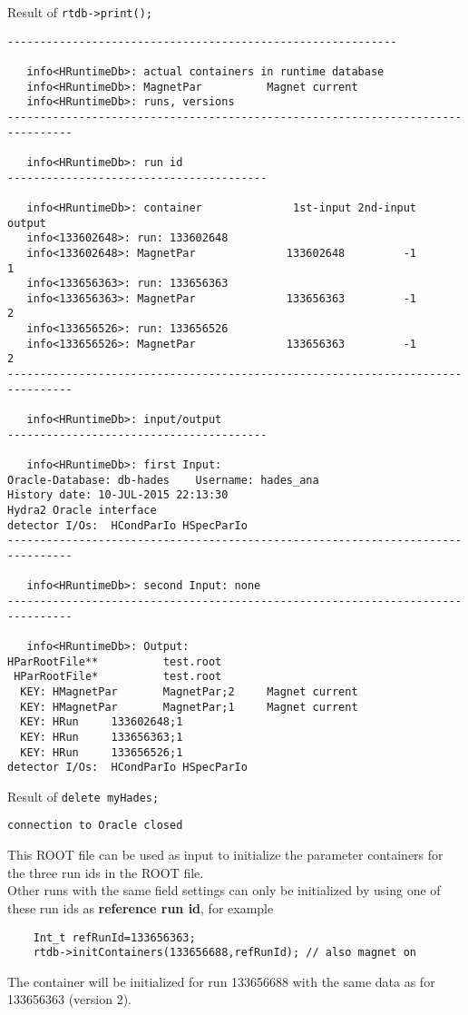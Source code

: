 Result of \verb+rtdb->print();+
\begin{lstlisting}
------------------------------------------------------------

   info<HRuntimeDb>: actual containers in runtime database
   info<HRuntimeDb>: MagnetPar          Magnet current
   info<HRuntimeDb>: runs, versions
--------------------------------------------------------------------------------

   info<HRuntimeDb>: run id
----------------------------------------

   info<HRuntimeDb>: container              1st-input 2nd-input    output
   info<133602648>: run: 133602648
   info<133602648>: MagnetPar              133602648         -1        1
   info<133656363>: run: 133656363
   info<133656363>: MagnetPar              133656363         -1        2
   info<133656526>: run: 133656526
   info<133656526>: MagnetPar              133656363         -1        2
--------------------------------------------------------------------------------

   info<HRuntimeDb>: input/output
----------------------------------------

   info<HRuntimeDb>: first Input:
Oracle-Database: db-hades    Username: hades_ana
History date: 10-JUL-2015 22:13:30
Hydra2 Oracle interface
detector I/Os:  HCondParIo HSpecParIo
--------------------------------------------------------------------------------

   info<HRuntimeDb>: second Input: none
--------------------------------------------------------------------------------

   info<HRuntimeDb>: Output:
HParRootFile**          test.root
 HParRootFile*          test.root
  KEY: HMagnetPar       MagnetPar;2     Magnet current
  KEY: HMagnetPar       MagnetPar;1     Magnet current
  KEY: HRun     133602648;1
  KEY: HRun     133656363;1
  KEY: HRun     133656526;1
detector I/Os:  HCondParIo HSpecParIo
\end{lstlisting}

Result of \verb+delete myHades;+
\begin{lstlisting}
connection to Oracle closed
\end{lstlisting}

This ROOT file can be used as input to initialize the parameter containers for the three run ids in the ROOT file.\\
Other runs with the same field settings can only be initialized by using one of these run ids as 
\textbf{reference run id}, for example
\begin{lstlisting}
    Int_t refRunId=133656363;
    rtdb->initContainers(133656688,refRunId); // also magnet on 
\end{lstlisting}
The container will be initialized for run 133656688 with the same data as for 133656363 (version 2).



